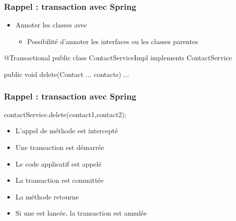 \begin{frame}[fragile]
 \frametitle{Rappel : transaction avec Spring}

 \begin{itemize}
  \item Annoter les classes avec 
  \begin{itemize}
   \item Possibilité d'annoter les interfaces ou les classes parentes
  \end{itemize}
 \end{itemize}
 
 \begin{javacode}
@Transactional
public class ContactServiceImpl implements ContactService {

  public void delete(Contact ... contacts) { ... }

}
 \end{javacode}
 
\end{frame}

\begin{frame}[fragile]
 \frametitle{Rappel : transaction avec Spring}
 
 \begin{javacode}
contactService.delete(contact1,contact2);
 \end{javacode}

 \begin{itemize}
  \item L'appel de méthode est intercepté
  \item Une transaction est démarrée
  \item Le code applicatif est appelé
  \item La transaction est committée
  \item La méthode retourne
  \item Si une  est lancée, la transaction est annulée
 \end{itemize}
 
\end{frame}

